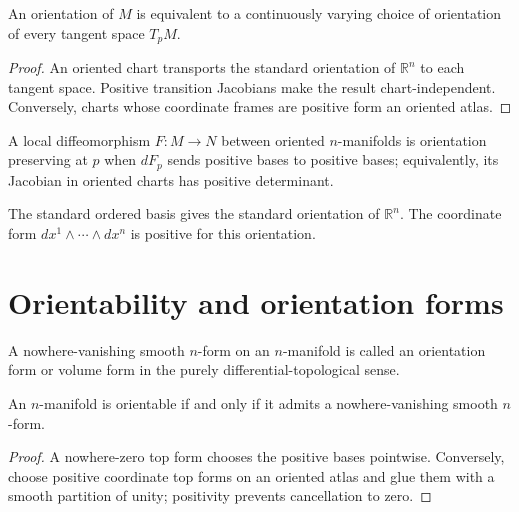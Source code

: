 \begin{theorem}\label{thm:vii10-tangent-orientation}
An orientation of $M$ is equivalent to a continuously varying choice of orientation of every tangent space $T_pM$.
\end{theorem}
\begin{proof}
An oriented chart transports the standard orientation of $\mathbb R^n$ to each tangent space. Positive transition Jacobians make the result chart-independent. Conversely, charts whose coordinate frames are positive form an oriented atlas.
\end{proof}

\begin{definition}\label{def:vii10-orientation-map}
A local diffeomorphism $F:M\to N$ between oriented $n$-manifolds is orientation preserving at $p$ when $dF_p$ sends positive bases to positive bases; equivalently, its Jacobian in oriented charts has positive determinant.
\end{definition}

\begin{example}\label{ex:vii10-euclidean}
The standard ordered basis gives the standard orientation of $\mathbb R^n$. The coordinate form $dx^1\wedge\cdots\wedge dx^n$ is positive for this orientation.
\end{example}

\section{Orientability and orientation forms}
\begin{definition}\label{def:vii10-orientation-form}
A nowhere-vanishing smooth $n$-form on an $n$-manifold is called an orientation form or volume form in the purely differential-topological sense.
\end{definition}

\begin{theorem}\label{thm:vii10-orientation-form}
An $n$-manifold is orientable if and only if it admits a nowhere-vanishing smooth $n$-form.
\end{theorem}
\begin{proof}
A nowhere-zero top form chooses the positive bases pointwise. Conversely, choose positive coordinate top forms on an oriented atlas and glue them with a smooth partition of unity; positivity prevents cancellation to zero.
\end{proof}

